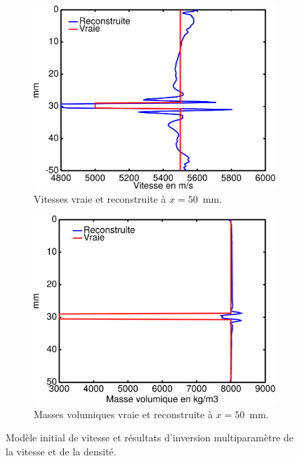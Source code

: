\begin{figure}[!h]
\begin{subfigure}[b]{0.4\textwidth}
		\includegraphics[width=\textwidth]{img/multi_param/coupe_vp_multi_vert.png}
		\caption{Vitesses vraie et reconstruite à $x=50$~mm.}
	\end{subfigure}
	\begin{subfigure}[b]{0.4\textwidth}
		\includegraphics[width=\textwidth]{img/multi_param/coupe_rho_multi_vert.png}
		\caption{Masses volumiques vraie et reconstruite à $x=50$~mm.}
	\end{subfigure}
	\caption{Modèle initial de vitesse et résultats d'inversion multiparamètre de la vitesse et de la densité.\label{app:inv_multi} }
\end{figure}






